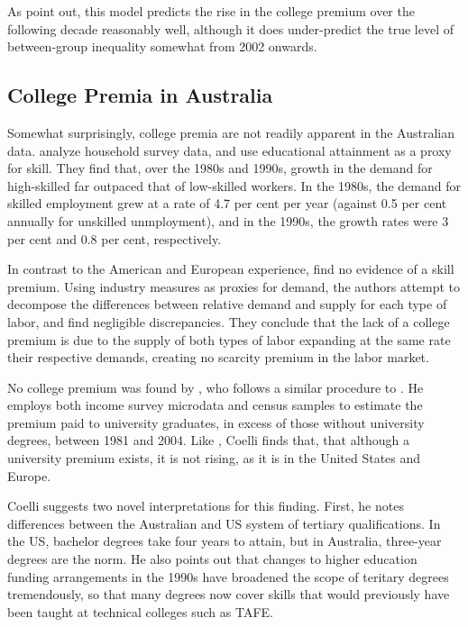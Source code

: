 As \citet{Acemoglu2011} point out, this model predicts the rise in the college premium over the following decade reasonably well, although it does under-predict the true level of between-group inequality somewhat from 2002 onwards.

\subsection{College Premia in Australia}

Somewhat surprisingly, college premia are not readily apparent in the Australian data. \citet{Barnes2002} analyze household survey data, and use educational attainment as a proxy for skill. They find that, over the 1980s and 1990s, growth in the demand for high-skilled far outpaced that of low-skilled workers. In the 1980s, the demand for skilled employment grew at a rate of 4.7 per cent per year (against 0.5 per cent annually for unskilled unmployment), and in the 1990s, the growth rates were 3 per cent and 0.8 per cent, respectively.

In contrast to the American and European experience, \citet{Barnes2002} find no evidence of a skill premium. Using industry measures as proxies for demand, the authors attempt to decompose the differences between relative demand and supply for each type of labor, and find negligible discrepancies. They conclude that the lack of a college premium  is due to the supply of both types of labor expanding at the same rate their respective demands, creating no scarcity premium in the labor market.

No college premium was found by \citet{Coelli2009}, who follows a similar procedure to \citet{Katz1992}. He employs both income survey microdata and census samples to estimate the premium paid to university graduates, in excess of those without university degrees, between 1981 and 2004. Like \citet{Barnes2002}, Coelli finds that, that although a university premium exists, it is not rising, as it is in the United States and Europe.

Coelli suggests two novel interpretations for this finding. First, he notes differences between the Australian and US system of tertiary qualifications. In the US, bachelor degrees take four years to attain, but in Australia, three-year degrees are the norm. He also points out that changes to higher education funding arrangements in the 1990s have broadened the scope of teritary degrees tremendously, so that many degrees now cover skills that would previously have been taught at technical colleges such as TAFE.

